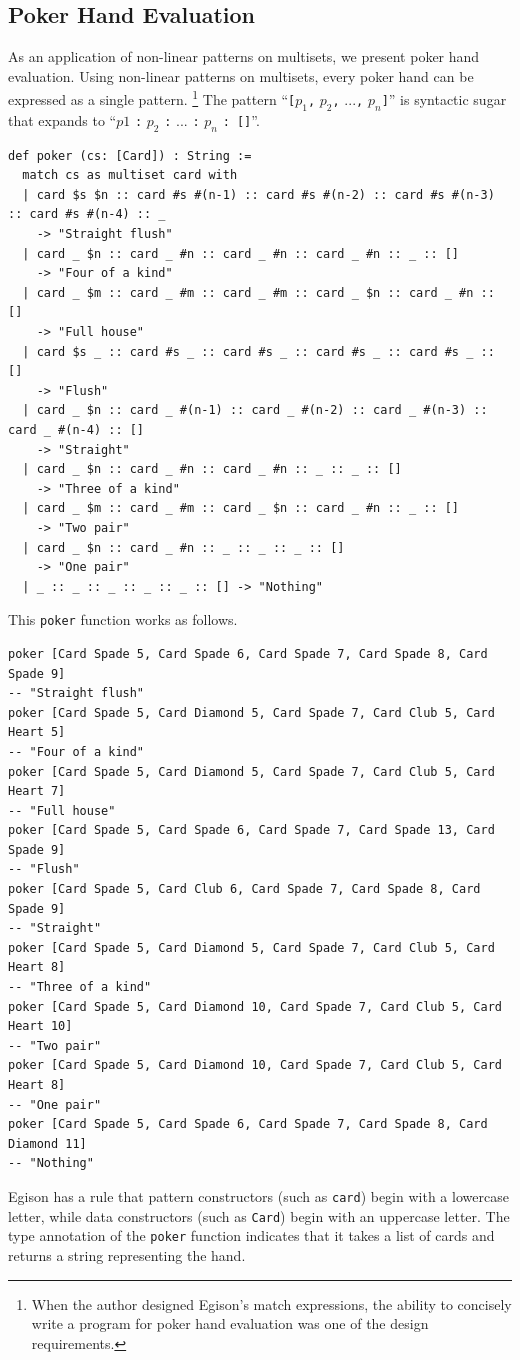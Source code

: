 \subsection{Poker Hand Evaluation}\label{pmo-poker}

As an application of non-linear patterns on multisets, we present poker hand evaluation.
Using non-linear patterns on multisets, every poker hand can be expressed as a single pattern.
\footnote{When the author designed Egison's match expressions, the ability to concisely write a program for poker hand evaluation was one of the design requirements.}
The pattern ``\lstinline{[}$p_1$\lstinline{,} $p_2$\lstinline{,} $...$\lstinline{,} $p_n$\lstinline{]}'' is syntactic sugar that expands to ``$p1$ \lstinline{:} $p_2$ \lstinline{:} $...$ \lstinline{:} $p_n$ \lstinline{: []}''.
\begin{lstlisting}[language=egison,numbers=none]
def poker (cs: [Card]) : String :=
  match cs as multiset card with
  | card $s $n :: card #s #(n-1) :: card #s #(n-2) :: card #s #(n-3) :: card #s #(n-4) :: _
    -> "Straight flush"
  | card _ $n :: card _ #n :: card _ #n :: card _ #n :: _ :: []
    -> "Four of a kind"
  | card _ $m :: card _ #m :: card _ #m :: card _ $n :: card _ #n :: []
    -> "Full house"
  | card $s _ :: card #s _ :: card #s _ :: card #s _ :: card #s _ :: []
    -> "Flush"
  | card _ $n :: card _ #(n-1) :: card _ #(n-2) :: card _ #(n-3) :: card _ #(n-4) :: []
    -> "Straight"
  | card _ $n :: card _ #n :: card _ #n :: _ :: _ :: []
    -> "Three of a kind"
  | card _ $m :: card _ #m :: card _ $n :: card _ #n :: _ :: []
    -> "Two pair"
  | card _ $n :: card _ #n :: _ :: _ :: _ :: []
    -> "One pair"
  | _ :: _ :: _ :: _ :: _ :: [] -> "Nothing"
\end{lstlisting}
This \lstinline{poker} function works as follows.
\begin{lstlisting}[language=egison,numbers=none]
poker [Card Spade 5, Card Spade 6, Card Spade 7, Card Spade 8, Card Spade 9]
-- "Straight flush"
poker [Card Spade 5, Card Diamond 5, Card Spade 7, Card Club 5, Card Heart 5]
-- "Four of a kind"
poker [Card Spade 5, Card Diamond 5, Card Spade 7, Card Club 5, Card Heart 7]
-- "Full house"
poker [Card Spade 5, Card Spade 6, Card Spade 7, Card Spade 13, Card Spade 9]
-- "Flush"
poker [Card Spade 5, Card Club 6, Card Spade 7, Card Spade 8, Card Spade 9]
-- "Straight"
poker [Card Spade 5, Card Diamond 5, Card Spade 7, Card Club 5, Card Heart 8]
-- "Three of a kind"
poker [Card Spade 5, Card Diamond 10, Card Spade 7, Card Club 5, Card Heart 10]
-- "Two pair"
poker [Card Spade 5, Card Diamond 10, Card Spade 7, Card Club 5, Card Heart 8]
-- "One pair"
poker [Card Spade 5, Card Spade 6, Card Spade 7, Card Spade 8, Card Diamond 11]
-- "Nothing"
\end{lstlisting}
Egison has a rule that pattern constructors (such as \lstinline{card}) begin with a lowercase letter, while data constructors (such as \lstinline{Card}) begin with an uppercase letter.
The type annotation of the \lstinline{poker} function indicates that it takes a list of cards and returns a string representing the hand.

